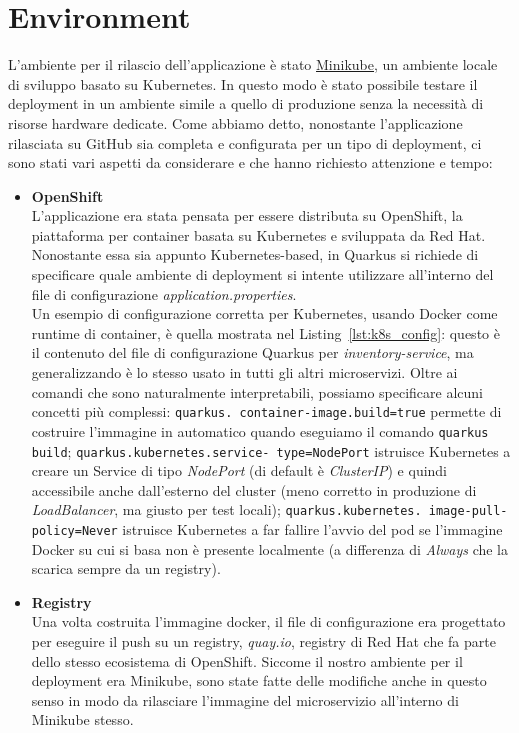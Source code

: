 \section{Environment}
L'ambiente per il rilascio dell'applicazione è stato \href{https://minikube.sigs.k8s.io/docs/}{Minikube}, un ambiente locale di sviluppo basato su Kubernetes. In questo modo è stato possibile testare il deployment in un ambiente simile a quello di produzione senza la necessità di risorse hardware dedicate. Come abbiamo detto, nonostante l'applicazione rilasciata su GitHub sia completa e configurata per un tipo di deployment, ci sono stati vari aspetti da considerare e che hanno richiesto attenzione e tempo:
\begin{itemize}
    \item \textbf{OpenShift} \\
        L'applicazione era stata pensata per essere distributa su OpenShift, la piattaforma per container basata su Kubernetes e sviluppata da Red Hat. Nonostante essa sia appunto Kubernetes-based, in Quarkus si richiede di specificare quale ambiente di deployment si intente utilizzare all'interno del file di configurazione \textit{application.properties}. \\
        Un esempio di configurazione corretta per Kubernetes, usando Docker come runtime di container, è quella mostrata nel Listing~\ref{lst:k8s_config}: questo è il contenuto del file di configurazione Quarkus per \textit{inventory-service}, ma generalizzando è lo stesso usato in tutti gli altri microservizi. Oltre ai comandi che sono naturalmente interpretabili, possiamo specificare alcuni concetti più complessi: \texttt{quarkus. \allowbreak container-image.build=true} permette di costruire l'immagine in automatico quando eseguiamo il comando \texttt{quarkus build}; \texttt{quarkus.kubernetes.service- \allowbreak type=NodePort} istruisce Kubernetes a creare un Service di tipo \textit{NodePort} (di default è \textit{ClusterIP}) e quindi accessibile anche dall'esterno del cluster (meno corretto in produzione di \textit{LoadBalancer}, ma giusto per test locali); \texttt{quarkus.kubernetes. \allowbreak image-pull-policy=Never} istruisce Kubernetes a far fallire l'avvio del pod se l'immagine Docker su cui si basa non è presente localmente (a differenza di \textit{Always} che la scarica sempre da un registry).
    \item \textbf{Registry} \\
        Una volta costruita l'immagine docker, il file di configurazione era progettato per eseguire il push su un registry, \textit{quay.io}, registry di Red Hat che fa parte dello stesso ecosistema di OpenShift. Siccome il nostro ambiente per il deployment era Minikube, sono state fatte delle modifiche anche in questo senso in modo da rilasciare l'immagine del microservizio all'interno di Minikube stesso. \\

\end{itemize}
